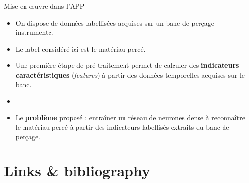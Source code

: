 \documentclass[10pt,serif,mathserif,compress,hyperref={colorlinks}]{beamer}
\begin{document}
\begin{frame}{Mise en {\oe}uvre dans l'APP}

  \begin{tcolorbox}[title=Étape 2 -- Problème : classification des données \\
      \hspace*{20mm}d'un banc de perçage]
    \begin{itemize}
    \item On dispose de données labellisées acquises sur un banc de perçage instrumenté.
      \item Le label considéré ici est le matériau percé.
    \item Une première étape de pré-traitement permet de calculer des {\bf indicateurs caractéristiques} 
      ({\em features}) à partir des données temporelles acquises sur le banc.
    \item {}
    \item Le \textbf{problème} proposé : entraîner un réseau de neurones dense à reconnaître le matériau percé
      à partir des indicateurs labellisés extraits du banc de perçage.
    \end{itemize}
      
  \end{tcolorbox}

\end{frame}

\section{Links \& bibliography}
\end{document}
